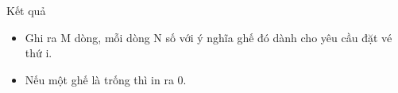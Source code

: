 Kết quả
\begin{itemize}
	\item     Ghi ra M dòng, mỗi dòng N số với ý nghĩa ghế đó dành cho yêu cầu đặt vé thứ i.   
	\item     Nếu một ghế là trống thì in ra 0.   
\end{itemize}